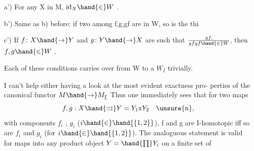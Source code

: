 a') For any X in M, $\mathrm{id}_X\hand{\in} W$ .

b') Same as b) before: if two among f,g,gf are in W, so is the thi

c') If $f\colon X\hand{\to} Y$ and $g\colon Y\hand{\to} X$ are such that $gf,\over{gf}{gf}\hand{\in} W$, then $f,g\hand{\in} W$ .

Each of these conditions carries over from W to a $W_{\underline{I}}$ trivially.

I can't help either having a look at the most evident exactness pro-%
perties of the canonical functor $M\hand{\to} M_{\underline{I}}$  Thus one immediately sees
that for two maps
\[ f,g : X\hand{\rightrightarrows} Y=Y_1\mathrm{x}Y_2 \quad \unsure{\mathrm n}, \]
with components $f_i$ , $g_i$ ($i\hand{\in}\hand{\{1,2\}}$), f and g are I-homotopic  iff so are
$f_i$ and $g_i$ (for $i\hand{\in}\hand{\{1,2\}}$). The analoguous statement is valid for  maps
into any product object $Y=\hand{\prod} Y_i$  on a finite set of

